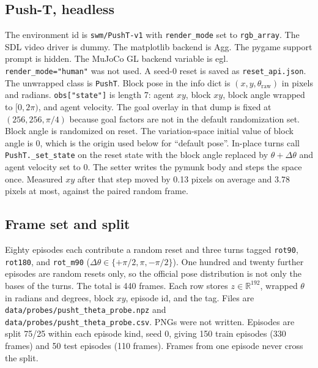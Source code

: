 \documentclass[11pt,a4paper]{article}
\begin{document}
\subsection{Push-T, headless}
The environment id is \texttt{swm/PushT-v1} with \texttt{render\_mode} set to \texttt{rgb\_array}.
The SDL video driver is dummy.
The matplotlib backend is Agg.
The pygame support prompt is hidden.
The MuJoCo GL backend variable is egl.
\texttt{render\_mode="human"} was not used.
A seed-0 reset is saved as \texttt{reset\_api.json}.
The unwrapped class is \texttt{PushT}.
Block pose in the info dict is $(x,y,\theta_{\mathrm{raw}})$ in pixels and radians.
\texttt{obs["state"]} is length 7: agent $xy$, block $xy$, block angle wrapped to $[0,2\pi)$, and agent velocity.
The goal overlay in that dump is fixed at $(256,256,\pi/4)$ because goal factors are not in the default randomization set.
Block angle is randomized on reset.
The variation-space initial value of block angle is 0, which is the origin used below for ``default pose''.
In-place turns call \texttt{PushT.\_set\_state} on the reset state with the block angle replaced by $\theta+\Delta\theta$ and agent velocity set to 0.
The setter writes the pymunk body and steps the space once.
Measured $xy$ after that step moved by 0.13 pixels on average and 3.78 pixels at most, against the paired random frame.

\subsection{Frame set and split}
Eighty episodes each contribute a random reset and three turns tagged \texttt{rot90}, \texttt{rot180}, and \texttt{rot\_m90} ($\Delta\theta\in\{+\pi/2,\pi,-\pi/2\}$).
One hundred and twenty further episodes are random resets only, so the official pose distribution is not only the bases of the turns.
The total is 440 frames.
Each row stores $z\in\mathbb{R}^{192}$, wrapped $\theta$ in radians and degrees, block $xy$, episode id, and the tag.
Files are \texttt{data/probes/pusht\_theta\_probe.npz} and \texttt{data/probes/pusht\_theta\_probe.csv}.
PNGs were not written.
Episodes are split 75/25 within each episode kind, seed 0, giving 150 train episodes (330 frames) and 50 test episodes (110 frames).
Frames from one episode never cross the split.
\end{document}
